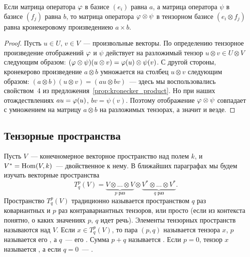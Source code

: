 \begin{theorem}
Если матрица оператора $\varphi$ в базисе $(e_i)$ равна $a$, а матрица
оператора $\psi$ в базисе $(f_j)$ равна $b$, то матрица оператора
$\varphi\otimes\psi$ в тензорном базисе $(e_i\otimes f_j)$ равна
кронекеровому произведениею $a\times b$.
\end{theorem}
\begin{proof}
Пусть $u\in U$, $v\in V$~--- произвольные векторы. По определению
тензорное произведение отображений $\varphi$ и $\psi$ действует на
разложимый тензор $u\otimes v\in U\otimes V$ следующим образом:
$(\varphi\otimes\psi)(u\otimes v) = \varphi(u)\otimes\psi(v)$.
С другой стороны, кронекерово произведение $a\otimes b$ умножается на
столбец $u\otimes v$ следующим образом:
$(a\otimes b)(u\otimes v) = (au\otimes bv)$~--- здесь мы
воспользовались свойством~4 из
предложения~\ref{prop:kronecker_product}.
Но при наших отождествлениях $au = \varphi(u)$, $bv = \psi(v)$. Поэтому
отображение $\varphi\otimes\psi$ совпадает с умножением на матрицу
$a\otimes b$ на разложимых тензорах, а значит и везде.
\end{proof}

\subsection{Тензорные пространства}


Пусть $V$~--- конечномерное векторное пространство над полем $k$, и
$V^* = \operatorname{Hom}(V,k)$~--- двойственное к нему. В ближайших
параграфах мы будем изучать векторные пространства
$$
T^p_q(V) = \underbrace{V\otimes\dots\otimes V}_{p\mbox{ раз}} \otimes
\underbrace{V^*\otimes\dots\otimes V^*}_{q\mbox{ раз}}.
$$
Пространство $T^p_q(V)$ традиционно называется пространством $q$ раз
ковариантных и $p$ раз контравариантных тензоров, или просто
 (если из
контекста понятно, о каких значениях $p$, $q$ идет речь). Элементы
тензорных пространств называются  над
$V$. Если $x\in T^p_q(V)$, то пара $(p,q)$ называется
 тензора $x$, $p$ называется его
, а 
$q$~--- его . Сумма $p+q$
называется . Если
$p=0$, тензор $x$ называется , а если $q=0$~---
.

